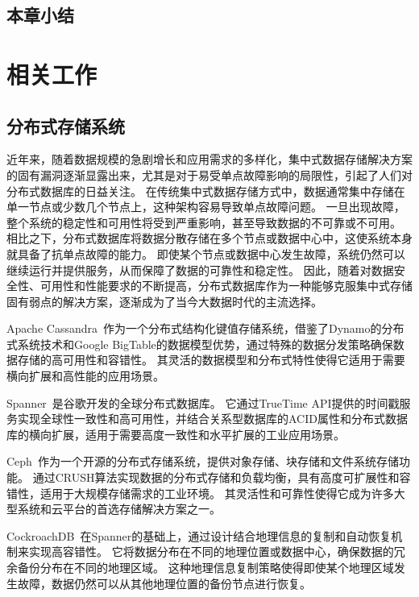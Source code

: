 \section{本章小结}


\chapter{相关工作}
\section{分布式存储系统}
近年来，随着数据规模的急剧增长和应用需求的多样化，集中式数据存储解决方案的固有漏洞逐渐显露出来，尤其是对于易受单点故障影响的局限性，引起了人们对分布式数据库的日益关注。
在传统集中式数据存储方式中，数据通常集中存储在单一节点或少数几个节点上，这种架构容易导致单点故障问题。
一旦出现故障，整个系统的稳定性和可用性将受到严重影响，甚至导致数据的不可靠或不可用。
相比之下，分布式数据库将数据分散存储在多个节点或数据中心中，这使系统本身就具备了抗单点故障的能力。
即使某个节点或数据中心发生故障，系统仍然可以继续运行并提供服务，从而保障了数据的可靠性和稳定性。
因此，随着对数据安全性、可用性和性能要求的不断提高，分布式数据库作为一种能够克服集中式存储固有弱点的解决方案，逐渐成为了当今大数据时代的主流选择。

Apache Cassandra~\cite{lakshman2010cassandra}作为一个分布式结构化键值存储系统，借鉴了Dynamo的分布式系统技术和Google BigTable的数据模型优势，通过特殊的数据分发策略确保数据存储的高可用性和容错性。
其灵活的数据模型和分布式特性使得它适用于需要横向扩展和高性能的应用场景。

Spanner~\cite{corbett2013spanner}是谷歌开发的全球分布式数据库。
它通过TrueTime API提供的时间戳服务实现全球性一致性和高可用性，并结合关系型数据库的ACID属性和分布式数据库的横向扩展，适用于需要高度一致性和水平扩展的工业应用场景。

Ceph~\cite{weil2006ceph}作为一个开源的分布式存储系统，提供对象存储、块存储和文件系统存储功能。
通过CRUSH算法实现数据的分布式存储和负载均衡，具有高度可扩展性和容错性，适用于大规模存储需求的工业环境。
其灵活性和可靠性使得它成为许多大型系统和云平台的首选存储解决方案之一。

CockroachDB~\cite{taft2020cockroachdb}在Spanner的基础上，通过设计结合地理信息的复制和自动恢复机制来实现高容错性。
它将数据分布在不同的地理位置或数据中心，确保数据的冗余备份分布在不同的地理区域。
这种地理信息复制策略使得即使某个地理区域发生故障，数据仍然可以从其他地理位置的备份节点进行恢复。

